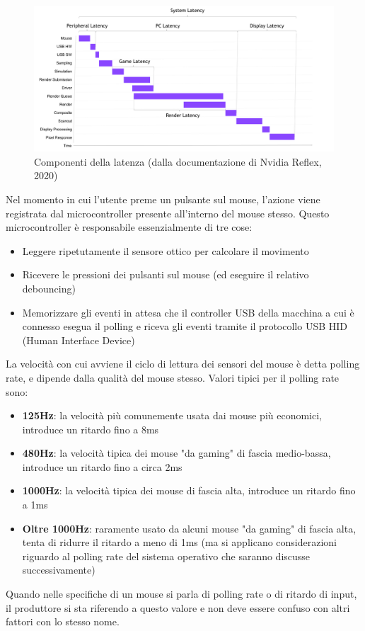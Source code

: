 \begin{figure}[h]
	\centering
	\includegraphics[width=\textwidth]{Introduzione_files/nvidia_latencypipeline.png}
	\caption{Componenti della latenza (dalla documentazione di Nvidia Reflex, 2020)}
	\label{fig:nvidia_latencypipeline}
\end{figure}

Nel momento in cui l'utente preme un pulsante sul mouse, l'azione viene registrata dal microcontroller presente all'interno del mouse stesso. Questo microcontroller è responsabile essenzialmente di tre cose:\begin{itemize}
	\item Leggere ripetutamente il sensore ottico per calcolare il movimento
	\item Ricevere le pressioni dei pulsanti sul mouse (ed eseguire il relativo debouncing)
	\item Memorizzare gli eventi in attesa che il controller USB della macchina a cui è connesso esegua il polling e riceva gli eventi tramite il protocollo USB HID (Human Interface Device)
\end{itemize}
La velocità con cui avviene il ciclo di lettura dei sensori del mouse è detta polling rate, e dipende dalla qualità del mouse stesso. Valori tipici per il polling rate sono:
\begin{itemize}
	\item \textbf{125Hz}: la velocità più comunemente usata dai mouse più economici, introduce un ritardo fino a 8ms
	\item \textbf{480Hz}: la velocità tipica dei mouse "da gaming" di fascia medio-bassa, introduce un ritardo fino a circa 2ms
	\item \textbf{1000Hz}: la velocità tipica dei mouse di fascia alta, introduce un ritardo fino a 1ms
	\item \textbf{Oltre 1000Hz}: raramente usato da alcuni mouse "da gaming" di fascia alta, tenta di ridurre il ritardo a meno di 1ms (ma si applicano considerazioni riguardo al polling rate del sistema operativo che saranno discusse successivamente)
\end{itemize}
Quando nelle specifiche di un mouse si parla di polling rate o di ritardo di input, il produttore si sta riferendo a questo valore e non deve essere confuso con altri fattori con lo stesso nome.


